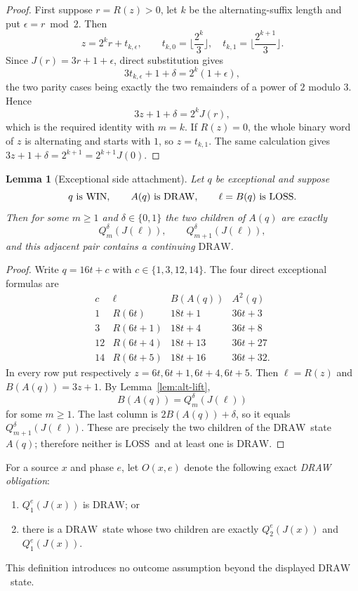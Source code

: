 \documentclass[11pt]{article}
\newtheorem{lemma}[theorem]{Lemma}
\newcommand{\WIN}{\ensuremath{\mathrm{WIN}}}
\newcommand{\LOSS}{\ensuremath{\mathrm{LOSS}}}
\newcommand{\DRAW}{\ensuremath{\mathrm{DRAW}}}
\begin{document}
\begin{proof}
First suppose $r=R(z)>0$, let $k$ be the alternating-suffix length and put
$\epsilon=r\bmod2$. Then
\[
 z=2^k r+t_{k,\epsilon},\qquad
 t_{k,0}=\Big\lfloor\frac{2^k}{3}\Big\rfloor,
 \quad t_{k,1}=\Big\lfloor\frac{2^{k+1}}{3}\Big\rfloor.
\]
Since $J(r)=3r+1+\epsilon$, direct substitution gives
\[
 3t_{k,\epsilon}+1+\delta=2^k(1+\epsilon),
\]
the two parity cases being exactly the two remainders of a power of $2$
modulo $3$. Hence
\[
 3z+1+\delta=2^kJ(r),
\]
which is the required identity with $m=k$. If $R(z)=0$, the whole binary word
of $z$ is alternating and starts with $1$, so
$z=t_{k,1}$. The same calculation gives
$3z+1+\delta=2^{k+1}=2^{k+1}J(0)$.
\end{proof}

\begin{lemma}[Exceptional side attachment]\label{lem:exceptional-side}
Let $q$ be exceptional and suppose
\[
 q\text{ is \WIN},\qquad A(q)\text{ is \DRAW},\qquad
 \ell=B(q)\text{ is \LOSS}.
\]
Then for some $m\ge1$ and $\delta\in\{0,1\}$ the two children of $A(q)$ are
exactly
\[
  Q_m^\delta(J(\ell)),\qquad Q_{m+1}^\delta(J(\ell)),
\]
and this adjacent pair contains a continuing \DRAW.
\end{lemma}

\begin{proof}
Write $q=16t+c$ with $c\in\{1,3,12,14\}$. The four direct exceptional
formulas are
\[
\begin{array}{c|c|c|c}
c&\ell&B(A(q))&A^2(q)\\ \hline
1&R(6t)&18t+1&36t+3\\
3&R(6t+1)&18t+4&36t+8\\
12&R(6t+4)&18t+13&36t+27\\
14&R(6t+5)&18t+16&36t+32.
\end{array}
\]
In every row put respectively $z=6t,6t+1,6t+4,6t+5$. Then
$\ell=R(z)$ and $B(A(q))=3z+1$. By Lemma~\ref{lem:alt-lift},
\[
  B(A(q))=Q_m^\delta(J(\ell))
\]
for some $m\ge1$. The last column is $2B(A(q))+\delta$, so it equals
$Q_{m+1}^\delta(J(\ell))$. These are precisely the two children of the
\DRAW\ state $A(q)$; therefore neither is \LOSS\ and at least one is \DRAW.
\end{proof}

For a source $x$ and phase $e$, let $O(x,e)$ denote the following exact
\emph{DRAW obligation}:
\begin{enumerate}[label=(\alph*)]
\item $Q_1^e(J(x))$ is \DRAW; or
\item there is a \DRAW\ state whose two children are exactly
      $Q_2^e(J(x))$ and $Q_1^e(J(x))$.
\end{enumerate}
This definition introduces no outcome assumption beyond the displayed
\DRAW\ state.
\end{document}
